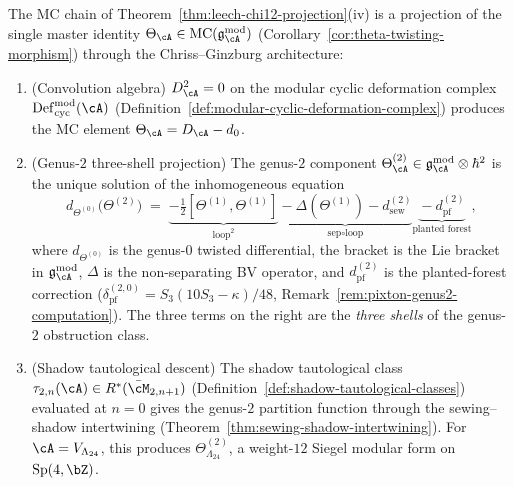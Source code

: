\begin{remark}%
\label{rem:chriss-ginzburg-bocherer}%
%
%
The MC chain of
Theorem~\ref{thm:leech-chi12-projection}\textup{(iv)}
is a projection of the single master identity
$\Theta_\cA \in \mathrm{MC}(\mathfrak{g}_\cA^{\mathrm{mod}})$
\textup{(}Corollary~\textup{\ref{cor:theta-twisting-morphism}}\textup{)}
through the Chriss--Ginzburg architecture:
\begin{enumerate}[label=\textup{(\roman*)}]
\item \textup{(Convolution algebra)}
$D_\cA^2 = 0$ on the modular cyclic deformation complex
$\mathrm{Def}_{\mathrm{cyc}}^{\mathrm{mod}}(\cA)$
\textup{(}Definition~\textup{\ref{def:modular-cyclic-deformation-complex}}\textup{)}
produces the MC element
$\Theta_\cA = D_\cA - d_0$.

\item \textup{(Genus-$2$ three-shell projection)}
The genus-$2$ component
$\Theta_\cA^{(2)} \in
\mathfrak{g}_\cA^{\mathrm{mod}} \otimes \hbar^2$
is the unique solution of the inhomogeneous equation
\[
d_{\Theta^{(0)}}\!\bigl(\Theta^{(2)}\bigr)
\;=\;
\underbrace{-\tfrac12[\Theta^{(1)},\Theta^{(1)}]}_
 {\text{loop}^2}
\underbrace{{}-\Delta(\Theta^{(1)}) - d_{\mathrm{sew}}^{(2)}}_
 {\text{sep}\circ\text{loop}}
\underbrace{{}-d_{\mathrm{pf}}^{(2)}}_
 {\text{planted forest}},
\]
where $d_{\Theta^{(0)}}$ is the genus-$0$ twisted differential,
the bracket is the Lie bracket in
$\mathfrak{g}_\cA^{\mathrm{mod}}$, $\Delta$ is the
non-separating BV operator, and
$d_{\mathrm{pf}}^{(2)}$ is the planted-forest correction
\textup{(}$\delta_{\mathrm{pf}}^{(2,0)} =
S_3(10S_3 - \kappa)/48$,
Remark~\textup{\ref{rem:pixton-genus2-computation}}\textup{)}.
The three terms on the right are the \emph{three shells}
of the genus-$2$ obstruction class.

\item \textup{(Shadow tautological descent)}
The shadow tautological class
$\tau_{2,n}(\cA) \in R^*(\bar{\cM}_{2,n+1})$
\textup{(}Definition~\textup{\ref{def:shadow-tautological-classes}}\textup{)}
evaluated at $n = 0$ gives the genus-$2$ partition function
through the sewing--shadow intertwining
\textup{(}Theorem~\textup{\ref{thm:sewing-shadow-intertwining}}\textup{)}.
For $\cA = V_{\Lambda_{24}}$, this produces
$\Theta^{(2)}_{\Lambda_{24}}$, a weight-$12$ Siegel modular
form on $\mathrm{Sp}(4,\bZ)$.


\end{enumerate}
\end{remark}
